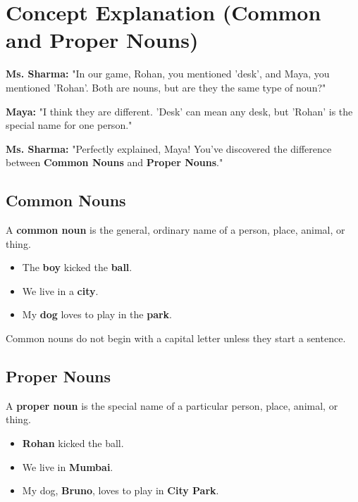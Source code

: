 \section{Concept Explanation (Common and Proper Nouns)}
\textbf{Ms. Sharma:} "In our game, Rohan, you mentioned 'desk', and Maya, you mentioned 'Rohan'. Both are nouns, but are they the same type of noun?"

\textbf{Maya:} "I think they are different. 'Desk' can mean any desk, but 'Rohan' is the special name for one person."

\textbf{Ms. Sharma:} "Perfectly explained, Maya! You've discovered the difference between \textbf{Common Nouns} and \textbf{Proper Nouns}."

\subsection*{Common Nouns}
A \textbf{common noun} is the general, ordinary name of a person, place, animal, or thing.

\begin{examplebox}
    \begin{itemize}
        \item The \textbf{boy} kicked the \textbf{ball}.
        \item We live in a \textbf{city}.
        \item My \textbf{dog} loves to play in the \textbf{park}.
    \end{itemize}
\end{examplebox}

Common nouns do not begin with a capital letter unless they start a sentence.

\subsection*{Proper Nouns}
A \textbf{proper noun} is the special name of a particular person, place, animal, or thing.

\begin{examplebox}
    \begin{itemize}
        \item \textbf{Rohan} kicked the ball.
        \item We live in \textbf{Mumbai}.
        \item My dog, \textbf{Bruno}, loves to play in \textbf{City Park}.
    \end{itemize}
\end{examplebox}

